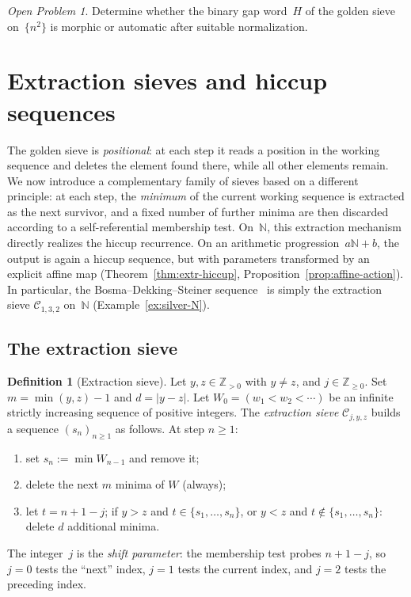 \documentclass[11pt]{article}
\numberwithin{equation}{section}
\theoremstyle{plain}
\theoremstyle{definition}
\newtheorem{definition}[theorem]{Definition}
\theoremstyle{remark}
\newtheorem{openproblem}[theorem]{Open Problem}
\newcommand{\N}{\mathbb{N}}
\newcommand{\Z}{\mathbb{Z}}
\begin{document}
\begin{openproblem}\label{op:squares}
Determine whether the binary gap word~$H$ of the golden sieve
on~$\{n^2\}$ is morphic or automatic after suitable normalization.
\end{openproblem}

\section{Extraction sieves and hiccup sequences}\label{sec:metallic}

The golden sieve is \emph{positional}: at each step it reads a position
in the working sequence and deletes the element found there, while all
other elements remain.  We now introduce a complementary family of sieves
based on a different principle: at each step, the \emph{minimum} of the
current working sequence is extracted as the next survivor, and a fixed
number of further minima are then discarded according to a self-referential
membership test.  On~$\N$, this extraction mechanism directly realizes the
hiccup recurrence.  On an arithmetic progression~$a\N+b$, the output is
again a hiccup sequence, but with parameters transformed by an explicit
affine map (Theorem~\ref{thm:extr-hiccup}, Proposition~\ref{prop:affine-action}).
In particular, the Bosma--Dekking--Steiner
sequence~\cite{BDS2018} is simply the extraction sieve
$\mathcal{C}_{1,3,2}$ on~$\N$ (Example~\ref{ex:silver-N}).

\subsection{The extraction sieve}\label{sec:extr-def}

\begin{definition}[Extraction sieve]\label{def:extraction}
Let $y,z\in\Z_{>0}$ with $y\neq z$, and $j\in\Z_{\ge0}$.
Set $m=\min(y,z)-1$ and $d=|y-z|$.
Let $W_0=(w_1<w_2<\cdots)$ be an infinite strictly increasing
sequence of positive integers.
The \emph{extraction sieve} $\mathcal{C}_{j,y,z}$ builds a sequence
$(s_n)_{n\ge1}$ as follows.
At step $n\ge1$:
\begin{enumerate}
\item[(i)] set $s_n:=\min W_{n-1}$ and remove it;
\item[(ii)] delete the next $m$ minima of $W$ (always);
\item[(iii)] let $t=n+1-j$; if $y>z$ and $t\in\{s_1,\ldots,s_n\}$,
  or $y<z$ and $t\notin\{s_1,\ldots,s_n\}$: delete $d$ additional
  minima.
\end{enumerate}
The integer~$j$ is the \emph{shift parameter}: the membership test
probes $n+1-j$, so $j=0$ tests the ``next'' index, $j=1$ tests
the current index, and $j=2$ tests the preceding index.
\end{definition}
\end{document}
